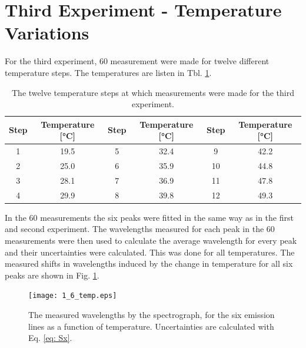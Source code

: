 \newpage
\section{Third Experiment - Temperature Variations}

For the third experiment, 60 measurement were made for twelve different temperature steps. The temperatures are listen in Tbl. \ref{tbl: temp}.

\begin{table}[!h]
\centering
    \begin{tabular}{cccccc}
    \hline
    Step & Temperature [°C] & Step& Temperature [°C] & Step  & Temperature [°C] \\
    \hline
    1    & 19.5             & 5 & 32.4             & 9  & 42.2             \\
    2    & 25.0             & 6 & 35.9             & 10 & 44.8             \\
    3    & 28.1             & 7 & 36.9             & 11 & 47.8             \\
    4    & 29.9             & 8 & 39.8             & 12 & 49.3             \\
    \hline
    \end{tabular}
    \caption{The twelve temperature steps at which measurements were made for the third experiment.}
    \label{tbl: temp}
\end{table}


In the 60 measurements the six peaks were fitted in the same way as in the first and second experiment. The wavelengths measured for each peak in the 60 measurements were then used to calculate the average wavelength for every peak and their uncertainties were calculated. This was done for all temperatures. The measured shifts in wavelengths induced by the change in temperature for all six peaks are shown in Fig. \ref{fig: exp3 1_6}. 

\begin{figure}[!h]
\centering
\texttt{[image: 1\_6\_temp.eps]}
\caption{The measured wavelengths by the spectrograph, for the six emission lines as a function of temperature. Uncertainties are calculated with Eq. \ref{eq: Sx}.}
\label{fig: exp3 1_6}
\end{figure}

